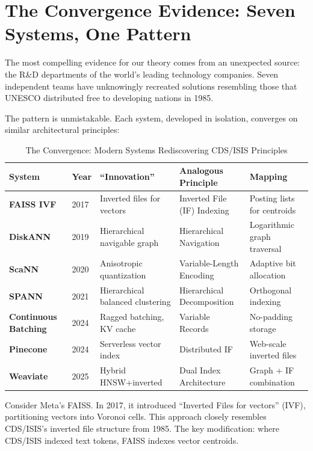 \documentclass[manuscript,screen,nonacm]{acmart}
\begin{document}
\section{The Convergence Evidence: Seven Systems, One Pattern}

The most compelling evidence for our theory comes from an unexpected source: the R\&D departments of the world's leading technology companies. Seven independent teams have unknowingly recreated solutions resembling those that UNESCO distributed free to developing nations in 1985.

The pattern is unmistakable. Each system, developed in isolation, converges on similar architectural principles:

\begin{table}[h]
\centering
\caption{The Convergence: Modern Systems Rediscovering CDS/ISIS Principles}
\label{tab:convergence}
\begin{tabular}{p{} p{} p{} p{} p{}}
\toprule
\textbf{System} & \textbf{Year} & \textbf{``Innovation''} & \textbf{Analogous Principle} & \textbf{Mapping} \\
\midrule
\textbf{FAISS IVF} \cite{johnson2017} & 2017 & Inverted files for vectors & Inverted File (IF) Indexing & Posting lists for centroids \\
\textbf{DiskANN} \cite{subramanya2019} & 2019 & Hierarchical navigable graph & Hierarchical Navigation & Logarithmic graph traversal \\
\textbf{ScaNN} \cite{guo2020} & 2020 & Anisotropic quantization & Variable-Length Encoding & Adaptive bit allocation \\
\textbf{SPANN} \cite{chen2021} & 2021 & Hierarchical balanced clustering & Hierarchical Decomposition & Orthogonal indexing \\
\textbf{Continuous Batching} \cite{reboul2025} & 2024 & Ragged batching, KV cache & Variable Records & No-padding storage \\
\textbf{Pinecone} \cite{pinecone2024} & 2024 & Serverless vector index & Distributed IF & Web-scale inverted files \\
\textbf{Weaviate} \cite{weaviate2025} & 2025 & Hybrid HNSW+inverted & Dual Index Architecture & Graph + IF combination \\
\bottomrule
\end{tabular}
\end{table}

Consider Meta's FAISS. In 2017, it introduced ``Inverted Files for vectors'' (IVF), partitioning vectors into Voronoi cells. This approach closely resembles CDS/ISIS's inverted file structure from 1985. The key modification: where CDS/ISIS indexed text tokens, FAISS indexes vector centroids.
\end{document}

